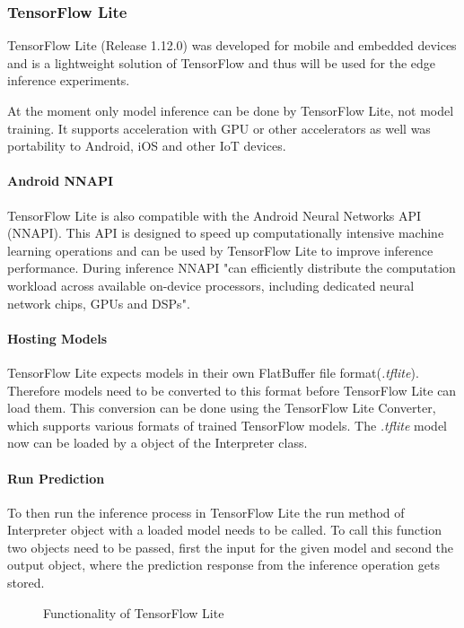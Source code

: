 \subsubsection{TensorFlow Lite}
TensorFlow Lite (Release 1.12.0) was developed for mobile and embedded devices and is a lightweight solution of TensorFlow and thus will be used for the edge inference experiments.

At the moment only model inference can be done by TensorFlow Lite, not model training.
It supports acceleration with GPU or other accelerators as well was portability to Android, iOS and other IoT devices.

\paragraph{Android NNAPI}
TensorFlow Lite is also compatible with the Android Neural Networks API (NNAPI). This API
is designed to speed up computationally intensive machine learning operations and can be used by TensorFlow Lite to improve inference performance. During inference NNAPI "can
efficiently distribute the computation workload across available on-device processors, including dedicated neural network chips, GPUs and DSPs"\cite{DBLP:journals/corr/abs-1810-01109}.



\paragraph{Hosting Models}
TensorFlow Lite expects models in their own FlatBuffer file  format(\emph{.tflite}). Therefore models need to be converted to this format before TensorFlow Lite can load them. This conversion can be done using the TensorFlow Lite Converter, which supports various formats of trained TensorFlow models.
The \emph{.tflite} model now can be loaded by a object of the Interpreter class.
\paragraph{Run Prediction}
To then run the inference process in TensorFlow Lite the run method of Interpreter object with a loaded model needs to be called. To call this function two objects need to be passed, first the input for the given model and second the output object, where the prediction response from the inference operation gets stored. 
\begin{figure}[H]
\centering

\caption{Functionality of TensorFlow Lite}
\label{fig:edge}
\end{figure}
